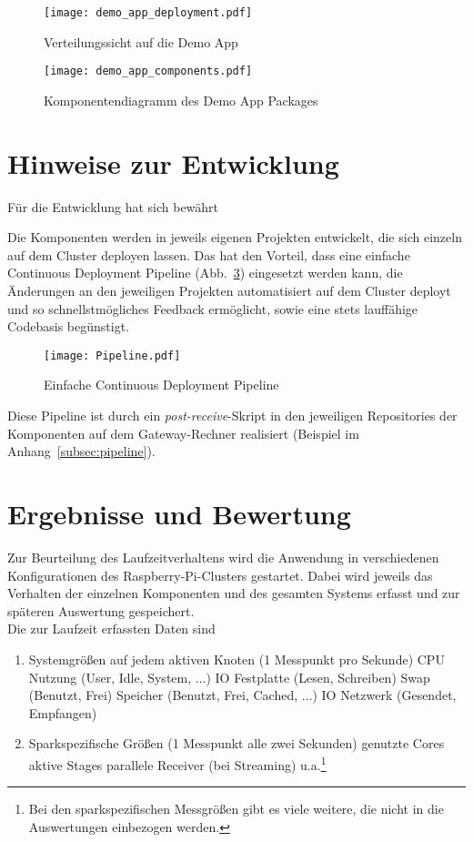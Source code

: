 \begin{figure}[ht!]
	\centering
  \texttt{[image: demo\_app\_deployment.pdf]}
	\caption{Verteilungssicht auf die Demo App}
	\label{figure:demo_app_verteilung}
\end{figure}


\begin{figure}[ht!]
	\centering
  \texttt{[image: demo\_app\_components.pdf]}
	\caption{Komponentendiagramm des Demo App Packages}
	\label{figure:demo_app_komponenten}
\end{figure}

\section{Hinweise zur Entwicklung}
Für die Entwicklung hat sich bewährt 

Die Komponenten werden in jeweils eigenen Projekten entwickelt, die sich einzeln auf dem Cluster deployen lassen. Das hat den Vorteil, dass eine einfache Continuous Deployment Pipeline (Abb.~\ref{figure:cd_pipeline}) eingesetzt werden kann, die Änderungen an den jeweiligen Projekten automatisiert auf dem Cluster deployt und so schnellstmögliches Feedback ermöglicht, sowie eine stets lauffähige Codebasis begünstigt.\\

\begin{figure}[ht!]
	\centering
  \texttt{[image: Pipeline.pdf]}
	\caption{Einfache Continuous Deployment Pipeline}
	\label{figure:cd_pipeline}
\end{figure}

Diese Pipeline ist durch ein \textit{post-receive}-Skript in den jeweiligen Repositories der Komponenten auf dem Gateway-Rechner realisiert (Beispiel im Anhang~\ref{subsec:pipeline}).\\


\section{Ergebnisse und Bewertung}

Zur Beurteilung des Laufzeitverhaltens wird die Anwendung in verschiedenen Konfigurationen des Raspberry-Pi-Clusters gestartet. Dabei wird jeweils das Verhalten der einzelnen Komponenten und des gesamten Systems erfasst und zur späteren Auswertung gespeichert.\\

Die zur Laufzeit erfassten Daten sind
\begin{enumerate}
	\item Systemgrößen auf jedem aktiven Knoten (1 Messpunkt pro Sekunde)
	\subitem CPU Nutzung (User, Idle, System, ...)
	\subitem IO Festplatte (Lesen, Schreiben)
	\subitem Swap (Benutzt, Frei)
	\subitem Speicher (Benutzt, Frei, Cached, ...)
	\subitem IO Netzwerk (Gesendet, Empfangen)
	\item Sparkspezifische Größen (1 Messpunkt alle zwei Sekunden)
	\subitem genutzte Cores
	\subitem aktive Stages
	\subitem parallele Receiver (bei Streaming)
	\subitem u.a.\footnote{Bei den sparkspezifischen Messgrößen gibt es viele weitere, die nicht in die Auswertungen einbezogen werden.}
\end{enumerate}

